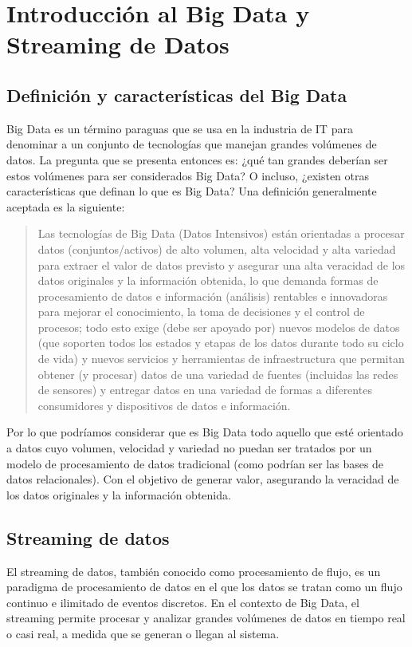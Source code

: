 \section{Introducción al Big Data y Streaming de Datos}
\subsection{Definición y características del Big Data}

Big Data es un término paraguas que se usa en la industria de IT para denominar a un conjunto de tecnologías que manejan grandes volúmenes de datos.
La pregunta que se presenta entonces es: ¿qué tan grandes deberían ser estos volúmenes para ser considerados Big Data?
O incluso, ¿existen otras características que definan lo que es Big Data?
Una definición generalmente aceptada es la siguiente:

\begin{quote}
Las tecnologías de Big Data (Datos Intensivos) están orientadas a
procesar datos (conjuntos/activos) de alto volumen, alta velocidad y alta variedad
para extraer el valor de datos previsto y asegurar una alta
veracidad de los datos originales y la información obtenida, lo que demanda
formas de procesamiento de datos e información (análisis) rentables e innovadoras
para mejorar el conocimiento, la toma de decisiones y el control de procesos;
todo esto exige (debe ser apoyado por) nuevos modelos de datos
(que soporten todos los estados y etapas de los datos durante todo su ciclo de vida)
y nuevos servicios y herramientas de infraestructura que permitan obtener (y procesar)
datos de una variedad de fuentes (incluidas las redes de sensores) y
entregar datos en una variedad de formas a diferentes consumidores y dispositivos
de datos e información. \parencite{demchenko2014addressing}
\end{quote}

\newpage
Por lo que podríamos considerar que es Big Data todo aquello que esté orientado a datos
cuyo volumen, velocidad y variedad no puedan ser tratados por un modelo de procesamiento
de datos tradicional (como podrían ser las bases de datos relacionales). Con el objetivo
de generar valor, asegurando la veracidad de los datos originales y la información obtenida.

\subsection{Streaming de datos}

El streaming de datos, también conocido como procesamiento de flujo, es un paradigma 
de procesamiento de datos en el que los datos se tratan como un flujo continuo e 
ilimitado de eventos discretos. En el contexto de Big Data, el streaming permite procesar 
y analizar grandes volúmenes de datos en tiempo real o casi real, a medida que se generan 
o llegan al sistema. \parencite{flink}


